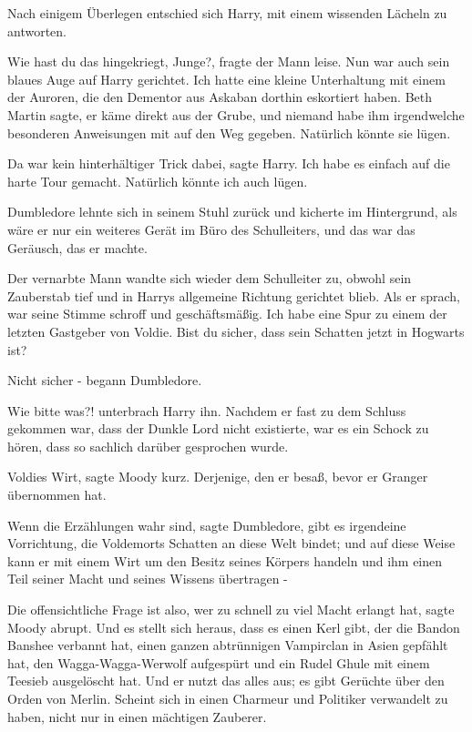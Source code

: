 Nach einigem Überlegen entschied sich Harry, mit einem wissenden Lächeln zu
antworten.

\glqq{}Wie hast du das hingekriegt, Junge?\grqq{}, fragte der Mann leise. Nun war
auch sein blaues Auge auf Harry gerichtet. \glqq{}Ich hatte eine kleine
Unterhaltung mit einem der Auroren, die den Dementor aus Askaban dorthin
eskortiert haben. Beth Martin sagte, er käme direkt aus der Grube, und niemand
habe ihm irgendwelche besonderen Anweisungen mit auf den Weg gegeben. Natürlich
könnte sie lügen.\grqq{}

\glqq{}Da war kein hinterhältiger Trick dabei\grqq{}, sagte Harry. \glqq{}Ich habe
es einfach auf die harte Tour gemacht. Natürlich könnte ich auch lügen.\grqq{}

Dumbledore lehnte sich in seinem Stuhl zurück und kicherte im Hintergrund, als
wäre er nur ein weiteres Gerät im Büro des Schulleiters, und das war das
Geräusch, das er machte.

Der vernarbte Mann wandte sich wieder dem Schulleiter zu, obwohl sein Zauberstab
tief und in Harrys allgemeine Richtung gerichtet blieb. Als er sprach, war seine
Stimme schroff und geschäftsmäßig. \glqq{}Ich habe eine Spur zu einem der letzten
Gastgeber von Voldie. Bist du sicher, dass sein Schatten jetzt in Hogwarts
ist?\grqq{}

\glqq{}Nicht sicher -\grqq{} begann Dumbledore.

\glqq{}Wie bitte was?!\grqq{} unterbrach Harry ihn. Nachdem er fast zu dem
Schluss gekommen war, dass der Dunkle Lord nicht existierte, war es ein Schock
zu hören, dass so sachlich darüber gesprochen wurde.

\glqq{}Voldies Wirt\grqq{}, sagte Moody kurz. \glqq{}Derjenige, den er besaß,
bevor er Granger übernommen hat.\grqq{}

\glqq{}Wenn die Erzählungen wahr sind\grqq{}, sagte Dumbledore, \glqq{}gibt es
irgendeine Vorrichtung, die Voldemorts Schatten an diese Welt bindet; und auf
diese Weise kann er mit einem Wirt um den Besitz seines Körpers handeln und ihm
einen Teil seiner Macht und seines Wissens übertragen -\grqq{}

\glqq{}Die offensichtliche Frage ist also, wer zu schnell zu viel Macht erlangt
hat\grqq{}, sagte Moody abrupt. \glqq{}Und es stellt sich heraus, dass es einen
Kerl gibt, der die Bandon Banshee verbannt hat, einen ganzen abtrünnigen
Vampirclan in Asien gepfählt hat, den Wagga-Wagga-Werwolf aufgespürt und ein
Rudel Ghule mit einem Teesieb ausgelöscht hat. Und er nutzt das alles aus; es
gibt Gerüchte über den Orden von Merlin. Scheint sich in einen Charmeur und
Politiker verwandelt zu haben, nicht nur in einen mächtigen Zauberer.\grqq{}


